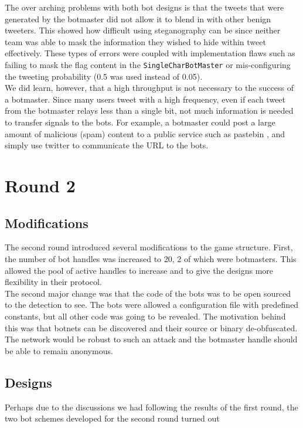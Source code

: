 \documentclass[11pt, oneside]{article} %
\numberwithin{equation}{section} %
\numberwithin{figure}{section} %
\numberwithin{table}{section} %
\renewcommand{\c}[1]{\texttt{#1}}
\begin{document}
		The over arching problems with both bot designs is that the tweets that were generated by the botmaster did not allow it to blend in with other benign tweeters. This showed how difficult using steganography can be since neither team was able to mask the information they wished to hide within tweet effectively. These types of errors were coupled with implementation flaws such as failing to mask the flag content in the \c{SingleCharBotMaster} or mis-configuring the tweeting probability (0.5 was used instead of 0.05). \\

		We did learn, however, that a high throughput is not necessary to the success of a botmaster. Since many users tweet with a high frequency, even if each tweet from the botmaster relays less than a single bit, not much information is needed to transfer signals to the bots. For example, a botmaster could post a large amount of malicious (spam) content to a public service such as pastebin \cite{pastebin}, and simply use twitter to communicate the URL to the bots. \\


\section{Round 2}
	\subsection{Modifications}
		The second round introduced several modifications to the game structure. First, the number of bot handles was increased to 20, 2 of which were botmasters. This allowed the pool of active handles to increase and to give the designs more flexibility in their protocol. \\

		The second major change was that the code of the bots was to be open sourced to the detection to see. The bots were allowed a configuration file with predefined constants, but all other code was going to be revealed. The motivation behind this was that botnets can be discovered and their source or binary de-obfuscated. The network would be robust to such an attack and the botmaster handle should be able to remain anonymous. \\

		
	\subsection{Designs}
        Perhaps due to the discussions we had following the results of the first round, the two bot schemes developed for the second round turned out 
\end{document}
